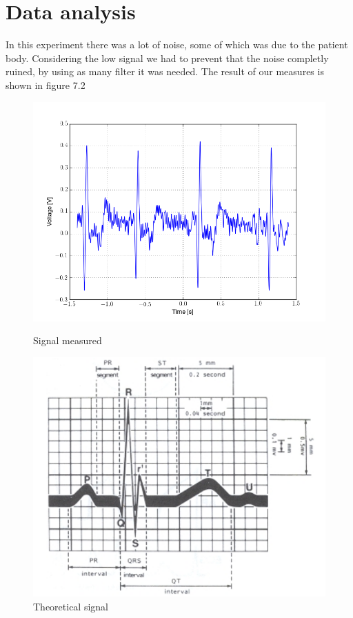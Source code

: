 \section{Data analysis}
In this experiment there was a lot of noise, some of which was due to the patient body. Considering the low signal we had to prevent that the noise completly ruined, by using as many filter it was needed. The result of our measures is shown in figure 7.2
\begin{figure}[H]
\begin{minipage}{.5\textwidth}
\centering
\includegraphics[width=\textwidth]{8/ecg.png}
\caption{Signal measured}
\end{minipage}%
\begin{minipage}{.5\textwidth}
\centering
\includegraphics[width=\textwidth]{8/theo.png}
\caption{Theoretical signal}
\end{minipage}
\end{figure}
